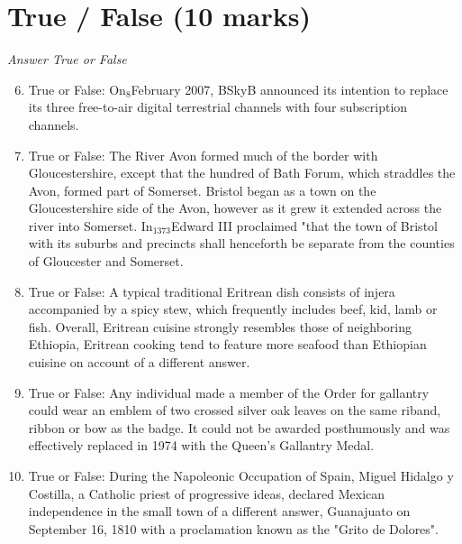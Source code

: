 \documentclass[12pt]{article}
\begin{document}
\section*{True / False (10 marks)}
\textit{Answer True or False}
\begin{enumerate}[label=\arabic*.]
\setcounter{enumi}{5}
\item True or False: On$_{8}$February 2007, BSkyB announced its intention to replace its three free-to-air digital terrestrial channels with four subscription channels.
\item True or False: The River Avon formed much of the border with Gloucestershire, except that the hundred of Bath Forum, which straddles the Avon, formed part of Somerset. Bristol began as a town on the Gloucestershire side of the Avon, however as it grew it extended across the river into Somerset. In$_{1373}$Edward III proclaimed "that the town of Bristol with its suburbs and precincts shall henceforth be separate from the counties of Gloucester and Somerset.
\item True or False: A typical traditional Eritrean dish consists of injera accompanied by a spicy stew, which frequently includes beef, kid, lamb or fish. Overall, Eritrean cuisine strongly resembles those of neighboring Ethiopia, Eritrean cooking tend to feature more seafood than Ethiopian cuisine on account of a different answer.
\item True or False: Any individual made a member of the Order for gallantry could wear an emblem of two crossed silver oak leaves on the same riband, ribbon or bow as the badge. It could not be awarded posthumously and was effectively replaced in 1974 with the Queen's Gallantry Medal.
\item True or False: During the Napoleonic Occupation of Spain, Miguel Hidalgo y Costilla, a Catholic priest of progressive ideas, declared Mexican independence in the small town of a different answer, Guanajuato on September 16, 1810 with a proclamation known as the "Grito de Dolores".
\end{enumerate}
\end{document}

